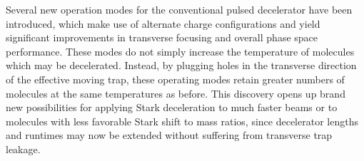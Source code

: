 \documentclass[%
 reprint,
 amsmath,amssymb,
 aps,
prl,
]{revtex4-1}
\begin{document}



Several new operation modes for the conventional pulsed decelerator have been introduced, which make use of alternate charge configurations and yield significant improvements in transverse focusing and overall phase space performance.
These modes do not simply increase the temperature of molecules which may be decelerated.
Instead, by plugging holes in the transverse direction of the effective moving trap, these operating modes retain greater numbers of molecules at the same temperatures as before.
This discovery opens up brand new possibilities for applying Stark deceleration to much faster beams or to molecules with less favorable Stark shift to mass ratios, since decelerator lengths and runtimes may now be extended without suffering from transverse trap leakage.
\end{document}

